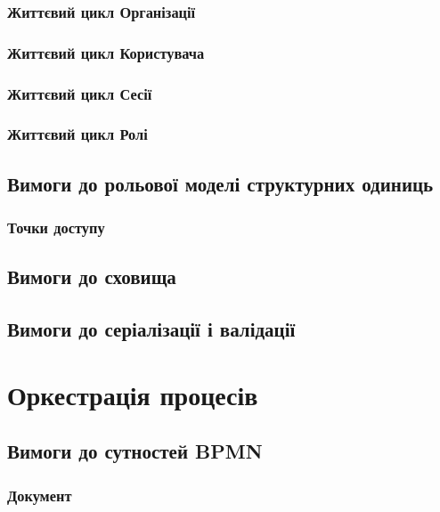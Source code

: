 \subsubsection{Життєвий цикл Організації}

\subsubsection{Життєвий цикл Користувача}

\subsubsection{Життєвий цикл Сесії}

\subsubsection{Життєвий цикл Ролі}

\subsection{Вимоги до рольової моделі структурних одиниць}

\subsubsection{Точки доступу}

\subsection{Вимоги до сховища}

\subsection{Вимоги до серіалізації і валідації}

\newpage
\section{Оркестрація процесів}

\subsection{Вимоги до сутностей BPMN}

\subsubsection{Документ}

